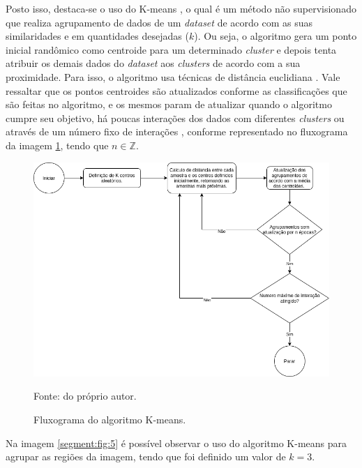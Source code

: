 Posto isso, destaca-se o uso do K-means \cite{macqueen1967some, bock2008origins}, o qual é um método não supervisionado que realiza agrupamento de dados de um \textit{dataset} de acordo com as suas similaridades e em quantidades desejadas ($k$). Ou seja, o algoritmo gera um ponto inicial randômico como centroide para um determinado \textit{cluster} e depois tenta atribuir os demais dados do \textit{dataset} aos \textit{clusters} de acordo com a sua proximidade. Para isso, o algoritmo usa técnicas de distância euclidiana \cite{Mahmud2012ImprovementAverage}. Vale ressaltar que os pontos centroides são atualizados conforme as classificações que são feitas no algoritmo, e os mesmos param de atualizar quando o algoritmo cumpre seu objetivo, há poucas interações dos dados com diferentes \textit{clusters} ou através de um número fixo de interações \cite{dunham2006data}, conforme representado no fluxograma da imagem \ref{segment:fig:6}, tendo que $n \in \mathbb{Z}$.

\begin{figure}[H]
    \centering
    \caption{Fluxograma do algoritmo K-means.}
    \includegraphics[width=1\linewidth]{recursos/imagens/image_seg/kmeans.png}
    \label{segment:fig:6}

    \vspace*{1 cm}
    Fonte: do próprio autor.
\end{figure}

Na imagem \ref{segment:fig:5} é possível observar o uso do algoritmo K-means para agrupar as regiões da imagem, tendo que foi definido um valor de $k = 3$.

